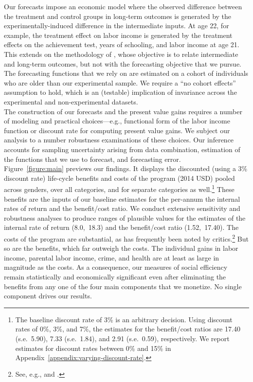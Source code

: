 \noindent Our forecasts impose an economic model where the observed difference between the treatment and control groups in long-term outcomes is generated by the experimentally-induced difference in the intermediate inputs. At age 22, for example, the treatment effect on labor income is generated by the treatment effects on the achievement test, years of schooling, and labor income at age 21. This extends on the methodology of \citet{Heckman_Pinto_etal_2013_PerryFactor}, whose objective is to  relate intermediate and long-term outcomes, but not with the forecasting objective that we pursue. The forecasting functions that we rely on are estimated on a cohort of individuals who are older than our experimental sample. We require a ``no cohort effects'' assumption to hold, which is an (testable) implication of invariance across the experimental and non-experimental datasets.\\ 

\noindent The construction of our forecasts and the present value gains requires a number of modeling and practical choices---e.g., functional form of the labor income function or discount rate for computing present value gains. We subject our analysis to a number robustness examinations of these choices. Our inference accounts for sampling uncertainty arising from data combination, estimation of the functions that we use to forecast, and forecasting error.\\

\noindent Figure~\ref{figure:main} previews our findings. It displays the discounted (using a 3\% discount rate) life-cycle benefits and costs of the program (2014 USD) pooled across genders, over all categories, and for separate categories as well.\footnote{The baseline discount rate of 3\% is an arbitrary decision. Using discount rates of 0\%, 3\%, and 7\%, the estimates for the benefit/cost ratios are 17.40 (s.e.\ 5.90), 7.33 (s.e.\ 1.84), and 2.91 (s.e.\ 0.59), respectively. We report estimates for discount rates between 0\% and 15\% in  Appendix~\ref{appendix:varying-discount-rate}.} These benefits are the inputs of our baseline estimates for the per-annum the internal rates of return and the benefit/cost ratio. We conduct extensive sensitivity and robustness analyses to produce ranges of plausible values for the estimates of the internal rate of return (8.0,\ 18.3) and the benefit/cost ratio (1.52,\ 17.40). The costs of the program are substantial, as has frequently been noted by critics.\footnote{See, e.g., \citet{Fox_News_2014_Head_Start_Effects} and \citet{Whitehurst_2014_Senate_Testimony}.} But so are the benefits, which far outweigh the costs. The individual gains in labor income, parental labor income, crime, and health are at least as large in magnitude as the costs. As a consequence, our measures of social efficiency remain statistically and economically significant even after eliminating the benefits from any one of the four main components that we monetize. No single component drives our results.\\

